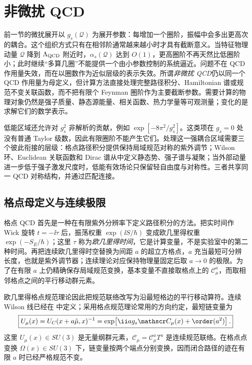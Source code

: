 \section{非微扰 QCD}\label{sec:qcd-nonperturbative-dp15}

前一节的微扰展开以 $g_s(\mathcal Q)$ 为展开参数：每增加一个圈阶，振幅中会多出更高次的耦合。这个组织方式只有在相邻阶通常越来越小时才具有截断意义。当特征物理动量 $\mathcal Q$ 降到 $\Lambda_{\rm QCD}$ 附近时，$\alpha_s(\mathcal Q)$ 达到 $O(1)$，更高圈阶不再天然比低圈阶小；此时继续“多算几圈”不能提供一个由小参数控制的系统逼近。问题不在 QCD 作用量失效，而在以圈数作为近似层级的表示失效。所谓\emph{非微扰 QCD}仍以同一个 QCD 作用量为母定义，但计算方法直接处理完整路径积分、Hamiltonian 谱或规范不变关联函数，而不把有限个 Feynman 圈阶作为主要截断参数。需要计算的物理对象仍然是强子质量、静态源能量、相关函数、热力学量等可观测量；变化的是求解它们的数学表示。

低能区域还允许对 $g_s^2$ 非解析的贡献，例如 $\exp[-8\pi^2/g_s^2]$。这类项在 $g_s=0$ 处没有普通 Taylor 级数，因此有限圈阶不能产生它们。处理这一强耦合区域需要三个彼此衔接的层级：格点路径积分提供保持局域规范对称的紫外调节；Wilson 环、Euclidean 关联函数和 Dirac 谱从中定义静态势、强子谱与凝聚；当外部动量进一步低于强子激发尺度时，低能有效场论只保留轻自由度与对称性。三者共享同一 QCD 对称结构，并通过匹配连接。

\subsection{格点母定义与连续极限}

格点 QCD 首先是一种在有限紫外分辨率下定义路径积分的方法。把实时间作 Wick 旋转 $t=-\ii\tau$ 后，振荡权重 $\exp(\ii S/\hbar)$ 变成欧几里得权重 $\exp(-S_E/\hbar)$；这里 $\tau$ 称为\emph{欧几里得时间}，它是计算变量，不是实验室中的第二种时间。再把连续欧几里得时空替换为间距 $a$ 的超立方格点，$a$ 充当最短可分辨长度，也就是紫外调节器；连续理论对应保持物理量固定后取 $a\to0$ 的极限。为了在有限 $a$ 上仍精确保存局域规范变换，基本变量不直接取格点上的 $\mathscr C_\mu^a$，而取相邻格点之间的平行移动群元素。

欧几里得格点规范理论因此把规范联络改写为沿最短格边的平行移动算符。连续 Wilson 线已经在 中定义；采用格点规范理论常用的方向约定，最短链变量为
\begin{equation}
 \boxed{
 U_\mu(x)
 =U_C(x+a\hat\mu,x)^{-1}
 =\exp\!\left[\ii a g_s\mathscr C_\mu(x)+\order(a^2)\right].}
 \label{eq:lattice-link-dp11}
\end{equation}
这里 $U_\mu(x)\in SU(3)$ 是无量纲群元素，$\mathscr C_\mu=\mathscr C_\mu^aT^a$ 是连续规范联络。在格点点变换 $\Omega(x)\in SU(3)$ 下，链变量按两个端点分别变换，因而闭合路径的迹在有限 $a$ 时已经严格规范不变。

